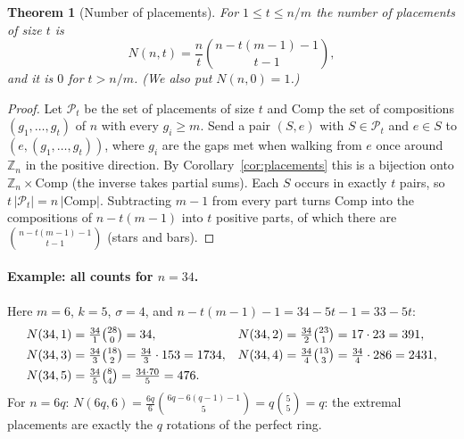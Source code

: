 \documentclass[11pt,a4paper]{article}
\newtheorem{theorem}{Theorem}[section]
\theoremstyle{definition}
\theoremstyle{remark}
\newcommand{\Z}{\mathbb{Z}}
\begin{document}
\begin{theorem}[Number of placements]\label{thm:count}
For $1\le t\le n/m$ the number of placements of size $t$ is
\[
N(n,t)=\frac nt\binom{n-t(m-1)-1}{t-1},
\]
and it is $0$ for $t>n/m$. (We also put $N(n,0)=1$.)
\end{theorem}
\begin{proof}
Let $\mathcal P_t$ be the set of placements of size $t$ and $\mathrm{Comp}$ the set of compositions $(g_1,\dots,g_t)$ of $n$ with every $g_i\ge m$.
Send a pair $(S,e)$ with $S\in\mathcal P_t$ and $e\in S$ to $(e,(g_1,\dots,g_t))$, where $g_i$ are the gaps met when walking from $e$ once around $\Z_n$ in the positive direction.
By Corollary~\ref{cor:placements} this is a bijection onto $\Z_n\times\mathrm{Comp}$ (the inverse takes partial sums). Each $S$ occurs in exactly $t$ pairs, so $t\,|\mathcal P_t|=n\,|\mathrm{Comp}|$.
Subtracting $m-1$ from every part turns $\mathrm{Comp}$ into the compositions of $n-t(m-1)$ into $t$ positive parts, of which there are $\binom{n-t(m-1)-1}{t-1}$ (stars and bars).
\end{proof}

\paragraph{Example: all counts for $n=34$.} Here $m=6$, $k=5$, $\sigma=4$, and $n-t(m-1)-1=34-5t-1=33-5t$:
\[
\begin{aligned}
N(34,1)&=\tfrac{34}{1}\tbinom{28}{0}=34, & N(34,2)&=\tfrac{34}{2}\tbinom{23}{1}=17\cdot23=391,\\
N(34,3)&=\tfrac{34}{3}\tbinom{18}{2}=\tfrac{34}{3}\cdot153=1734, & N(34,4)&=\tfrac{34}{4}\tbinom{13}{3}=\tfrac{34}{4}\cdot286=2431,\\
N(34,5)&=\tfrac{34}{5}\tbinom{8}{4}=\tfrac{34\cdot70}{5}=476.
\end{aligned}
\]
For $n=6q$: $N(6q,6)=\frac{6q}{6}\binom{6q-6(q-1)-1}{5}=q\binom55=q$: the extremal placements are exactly the $q$ rotations of the perfect ring.
\end{document}
